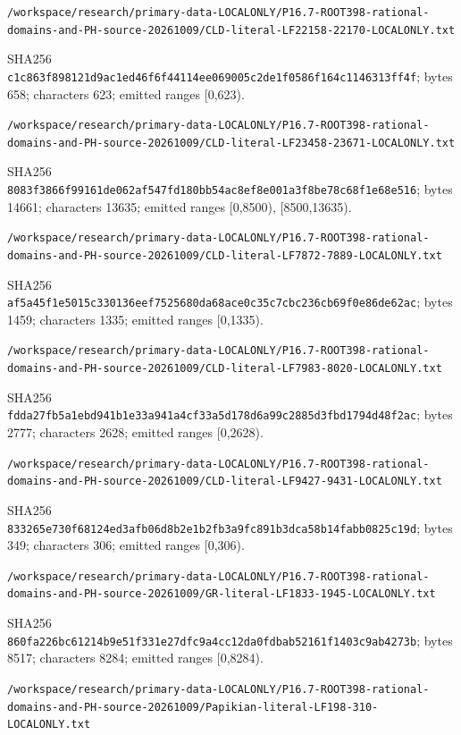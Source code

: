 \documentclass[11pt]{article}
\begin{document}
\texttt{/\allowbreak workspace/\allowbreak research/\allowbreak primary-data-LOCALONLY/\allowbreak P16.7-ROOT398-rational-domains-and-PH-source-20261009/\allowbreak CLD-literal-LF22158-22170-LOCALONLY.txt}

SHA256 \texttt{c1c863f898121d9ac1ed46f6f44114ee069005c2de1f0586f164c1146313ff4f}; bytes 658; characters 623; emitted ranges [0,623).

\texttt{/\allowbreak workspace/\allowbreak research/\allowbreak primary-data-LOCALONLY/\allowbreak P16.7-ROOT398-rational-domains-and-PH-source-20261009/\allowbreak CLD-literal-LF23458-23671-LOCALONLY.txt}

SHA256 \texttt{8083f3866f99161de062af547fd180bb54ac8ef8e001a3f8be78c68f1e68e516}; bytes 14661; characters 13635; emitted ranges [0,8500), [8500,13635).

\texttt{/\allowbreak workspace/\allowbreak research/\allowbreak primary-data-LOCALONLY/\allowbreak P16.7-ROOT398-rational-domains-and-PH-source-20261009/\allowbreak CLD-literal-LF7872-7889-LOCALONLY.txt}

SHA256 \texttt{af5a45f1e5015c330136eef7525680da68ace0c35c7cbc236cb69f0e86de62ac}; bytes 1459; characters 1335; emitted ranges [0,1335).

\texttt{/\allowbreak workspace/\allowbreak research/\allowbreak primary-data-LOCALONLY/\allowbreak P16.7-ROOT398-rational-domains-and-PH-source-20261009/\allowbreak CLD-literal-LF7983-8020-LOCALONLY.txt}

SHA256 \texttt{fdda27fb5a1ebd941b1e33a941a4cf33a5d178d6a99c2885d3fbd1794d48f2ac}; bytes 2777; characters 2628; emitted ranges [0,2628).

\texttt{/\allowbreak workspace/\allowbreak research/\allowbreak primary-data-LOCALONLY/\allowbreak P16.7-ROOT398-rational-domains-and-PH-source-20261009/\allowbreak CLD-literal-LF9427-9431-LOCALONLY.txt}

SHA256 \texttt{833265e730f68124ed3afb06d8b2e1b2fb3a9fc891b3dca58b14fabb0825c19d}; bytes 349; characters 306; emitted ranges [0,306).

\texttt{/\allowbreak workspace/\allowbreak research/\allowbreak primary-data-LOCALONLY/\allowbreak P16.7-ROOT398-rational-domains-and-PH-source-20261009/\allowbreak GR-literal-LF1833-1945-LOCALONLY.txt}

SHA256 \texttt{860fa226bc61214b9e51f331e27dfc9a4cc12da0fdbab52161f1403c9ab4273b}; bytes 8517; characters 8284; emitted ranges [0,8284).

\texttt{/\allowbreak workspace/\allowbreak research/\allowbreak primary-data-LOCALONLY/\allowbreak P16.7-ROOT398-rational-domains-and-PH-source-20261009/\allowbreak Papikian-literal-LF198-310-LOCALONLY.txt}
\end{document}
